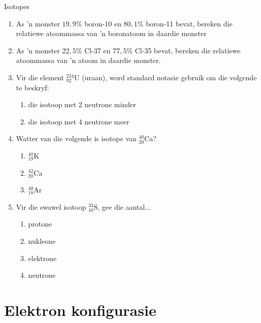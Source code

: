\begin{exercises}{Isotopes}
{\begin{enumerate}[noitemsep, label=\textbf{\arabic*}. ]
\item As 'n monster $19,9\%$ boron-10 en $80,1\%$ boron-11 bevat, bereken die relatiewe atoommassa van 'n boronatoom in daardie monster  

\item As  'n monster $22,5\%$ Cl-37 en $77,5\%$ Cl-35 bevat, bereken die relatiewe atoommassa van  'n atoom in daardie monster.

\item Vir die element $^{234}_{92}{\text{U}}$ (uraan), word standard notasie gebruik om die volgende te beskryf:
\begin{enumerate}[noitemsep, label=\textbf{\alph*}. ]
\item die isotoop met 2 neutrone minder
\item die isotoop met 4 neutrone meer
\end{enumerate}

\item Watter van die volgende is isotope van $^{40}_{20}\text{Ca}$?
\begin{enumerate}[noitemsep, label=\textbf{\alph*}. ]
\item $^{40}_{19}\text{K}$
\item $^{42}_{20}\text{Ca}$
\item $^{40}_{18}\text{Ar}$
\end{enumerate}

\item Vir die swawel isotoop $^{33}_{16}\text{S}$, gee die aantal...
\begin{enumerate}[noitemsep, label=\textbf{\alph*}. ]
\item{protone}
\item{nukleone}
\item{elektrone}
\item{neutrone}
\end{enumerate}
\hspace{1ex}        
\end{enumerate}

}
\end{exercises}

         \section{Elektron konfigurasie}
